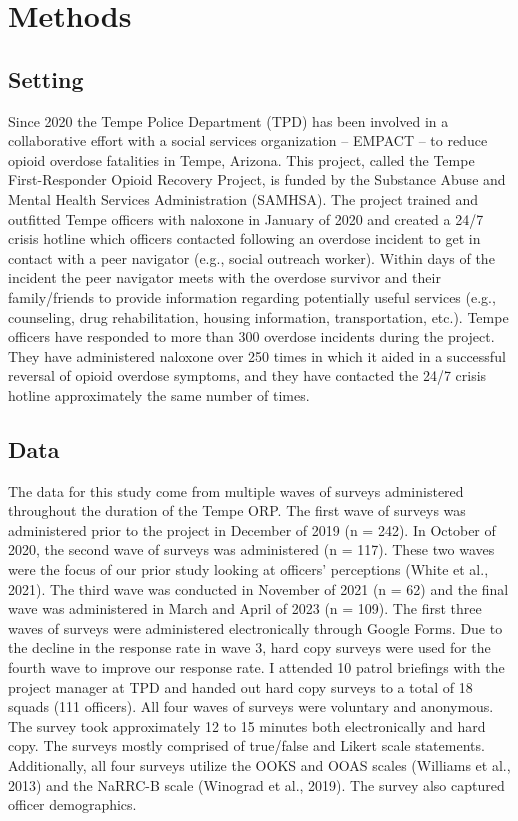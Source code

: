 \section{Methods}
\subsection{Setting}

Since 2020 the Tempe Police Department (TPD) has been involved in a collaborative effort with a social services organization – EMPACT – to reduce opioid overdose fatalities in Tempe, Arizona. This project, called the Tempe First-Responder Opioid Recovery Project, is funded by the Substance Abuse and Mental Health Services Administration (SAMHSA). The project trained and outfitted Tempe officers with naloxone in January of 2020 and created a 24/7 crisis hotline which officers contacted following an overdose incident to get in contact with a peer navigator (e.g., social outreach worker). Within days of the incident the peer navigator meets with the overdose survivor and their family/friends to provide information regarding potentially useful services (e.g., counseling, drug rehabilitation, housing information, transportation, etc.). Tempe officers have responded to more than 300 overdose incidents during the project. They have administered naloxone over 250 times in which it aided in a successful reversal of opioid overdose symptoms, and they have contacted the 24/7 crisis hotline approximately the same number of times. 

\subsection{Data}

The data for this study come from multiple waves of surveys administered throughout the duration of the Tempe ORP. The first wave of surveys was administered prior to the project in December of 2019 (n = 242). In October of 2020, the second wave of surveys was administered (n = 117). These two waves were the focus of our prior study looking at officers’ perceptions (White et al., 2021). The third wave was conducted in November of 2021 (n = 62) and the final wave was administered in March and April of 2023 (n = 109). The first three waves of surveys were administered electronically through Google Forms. Due to the decline in the response rate in wave 3, hard copy surveys were used for the fourth wave to improve our response rate.  I attended 10 patrol briefings with the project manager at TPD and handed out hard copy surveys to a total of 18 squads (111 officers). All four waves of surveys were voluntary and anonymous. The survey took approximately 12 to 15 minutes both electronically and hard copy. The surveys mostly comprised of true/false and Likert scale statements. Additionally, all four surveys utilize the OOKS and OOAS scales (Williams et al., 2013) and the NaRRC-B scale (Winograd et al., 2019). The survey also captured officer demographics.


